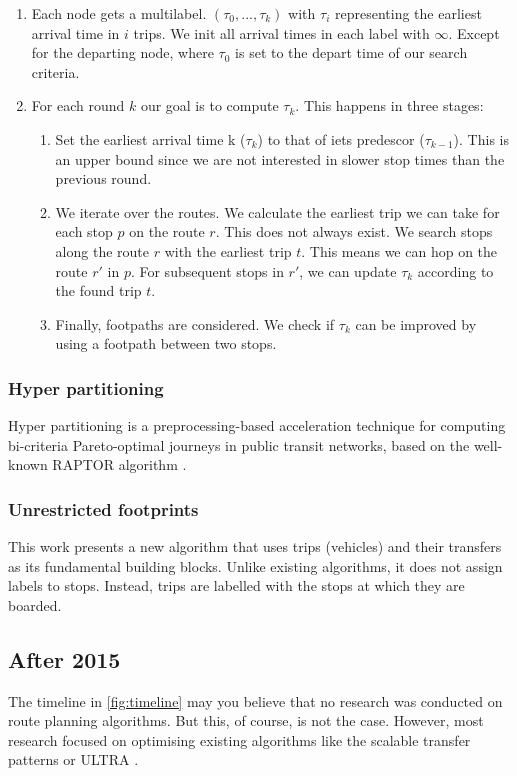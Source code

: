 \begin{enumerate}
    \item Each node gets a multilabel. $(\tau_0,...,\tau_k)$ with $\tau_i$ representing the earliest arrival time in $i$ trips. We init all arrival times in each label with $\infty$. Except for the departing node, where $\tau_0$ is set to the depart time of our search criteria.
    \item For each round $k$ our goal is to compute $\tau_k$. This happens in three stages:\begin{enumerate}
        \item Set the earliest arrival time k ($\tau_k$) to that of iets predescor ($\tau_{k-1}$). This is an upper bound since we are not interested in slower stop times than the previous round.
        \item We iterate over the routes. We calculate the earliest trip we can take for each stop $p$ on the route $r$. This does not always exist. We search stops along the route $r$ with the earliest trip $t$. This means we can hop on the route $r'$ in $p$. For subsequent stops in $r'$, we can update $\tau_k$ according to the found trip $t$.
        \item Finally, footpaths are considered. We check if $\tau_k$ can be improved by using a footpath between two stops. 
    \end{enumerate}
\end{enumerate}

\subsubsection{Hyper partitioning}
Hyper partitioning is a preprocessing-based acceleration technique for computing bi-criteria Pareto-optimal journeys in public transit networks, based on the well-known RAPTOR algorithm \cite{delling_round-based_2015}.
\subsubsection{Unrestricted footprints}
This work\cite{baum_ultra_2023} presents a new algorithm that uses trips (vehicles) and their transfers as its fundamental building blocks. Unlike existing algorithms, it does not assign labels to stops. Instead, trips are labelled with the stops at which they are boarded.
\subsection{After 2015}
The timeline in \autoref{fig:timeline} may you believe that no research was conducted on route planning algorithms. But this, of course, is not the case. However, most research focused on optimising existing algorithms like the scalable transfer patterns\cite{bast_scalable_2015} or ULTRA \cite{baum_ultra_2023}.

